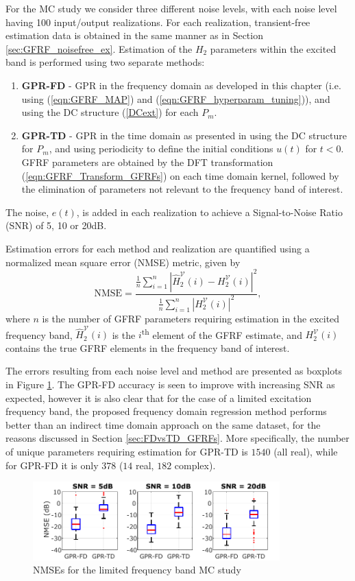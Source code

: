 For the MC study we consider three different noise levels, with each noise level having 100 input/output realizations. For each realization, transient-free estimation data is obtained in the same manner as in Section \ref{sec:GFRF_noisefree_ex}. Estimation of the $H_2$ parameters within the excited band is performed using two separate methods:
\begin{enumerate}
\item \textbf{GPR-FD} - GPR in the frequency domain as developed in this chapter (i.e. using (\ref{eqn:GFRF_MAP}) and (\ref{eqn:GFRF_hyperparam_tuning})), and using the DC structure (\ref{DCext}) for each $P_m$.
\item \textbf{GPR-TD} - GPR in the time domain as presented in \cite{Birpoutsoukis2017} using the DC structure for $P_m$, and using periodicity to define the initial conditions $u(t)$ for $t<0$. GFRF parameters are obtained by the DFT transformation (\ref{eqn:GFRF_Transform_GFRFs}) on each time domain kernel, followed by the elimination of parameters not relevant to the frequency band of interest. 
\end{enumerate}
The noise, $e(t)$, is added in each realization to achieve a Signal-to-Noise Ratio (SNR) of 5, 10 or 20dB.

Estimation errors for each method  and realization are quantified using a normalized mean square error (NMSE) metric, given by 
$$ \textrm{NMSE} = \frac{\frac{1}{n} \sum_{i=1}^{n} | \hat{H}_2^{\mathcal{V}}(i) -  H_2^{\mathcal{V}}(i)|^2}{\frac{1}{n} \sum_{i=1}^{n} |H_2^{\mathcal{V}}(i)|^2},$$
where $n$ is the number of GFRF parameters requiring estimation in the excited frequency band, $\hat{H}_2^{\mathcal{V}}(i)$ is the $i$\textsuperscript{th} element of the GFRF estimate, and $H_2^{\mathcal{V}}(i)$ contains the true GFRF elements in the frequency band of interest.

The errors resulting from each noise level and method are presented as boxplots in Figure \ref{fig:GFRF_MCstudy}. The GPR-FD accuracy is seen to improve with increasing SNR as expected, however it is also clear that for the case of a limited excitation frequency band, the proposed frequency domain regression method performs better than an indirect time domain approach on the same dataset, for the reasons discussed in Section \ref{sec:FDvsTD_GFRFs}. More specifically, the number of unique parameters requiring estimation for GPR-TD is $1540$ (all real), while for GPR-FD it is only $378$ ($14$ real, $182$ complex). 

\begin{figure}[h]
\centering
\includegraphics[width = 0.85\textwidth]{Chapter8_GFRFs/GFRF_MCstudy3.pdf}
\caption{NMSEs for the limited frequency band MC study}
\label{fig:GFRF_MCstudy}
\end{figure}

